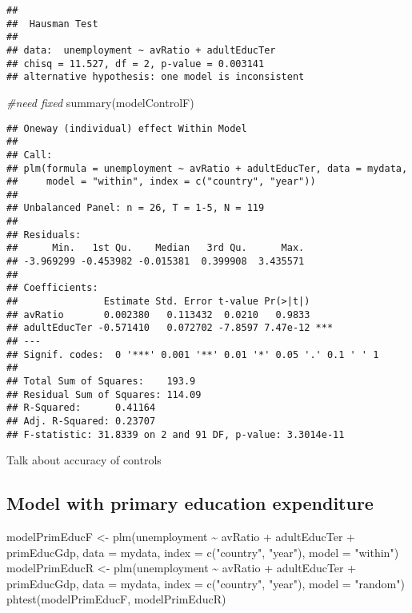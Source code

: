 \documentclass[
]{article}
\newenvironment{Shaded}{\begin{snugshade}}{\end{snugshade}}
\newcommand{\AttributeTok}[1]{\textcolor[rgb]{0.77,0.63,0.00}{#1}}
\newcommand{\CommentTok}[1]{\textcolor[rgb]{0.56,0.35,0.01}{\textit{#1}}}
\newcommand{\FunctionTok}[1]{\textcolor[rgb]{0.00,0.00,0.00}{#1}}
\newcommand{\NormalTok}[1]{#1}
\newcommand{\OtherTok}[1]{\textcolor[rgb]{0.56,0.35,0.01}{#1}}
\newcommand{\SpecialCharTok}[1]{\textcolor[rgb]{0.00,0.00,0.00}{#1}}
\newcommand{\StringTok}[1]{\textcolor[rgb]{0.31,0.60,0.02}{#1}}
\begin{document}
\begin{verbatim}
## 
##  Hausman Test
## 
## data:  unemployment ~ avRatio + adultEducTer
## chisq = 11.527, df = 2, p-value = 0.003141
## alternative hypothesis: one model is inconsistent
\end{verbatim}

\begin{Shaded}
\begin{Highlighting}[]
\CommentTok{\#need fixed}
\FunctionTok{summary}\NormalTok{(modelControlF)}
\end{Highlighting}
\end{Shaded}

\begin{verbatim}
## Oneway (individual) effect Within Model
## 
## Call:
## plm(formula = unemployment ~ avRatio + adultEducTer, data = mydata, 
##     model = "within", index = c("country", "year"))
## 
## Unbalanced Panel: n = 26, T = 1-5, N = 119
## 
## Residuals:
##      Min.   1st Qu.    Median   3rd Qu.      Max. 
## -3.969299 -0.453982 -0.015381  0.399908  3.435571 
## 
## Coefficients:
##               Estimate Std. Error t-value Pr(>|t|)    
## avRatio       0.002380   0.113432  0.0210   0.9833    
## adultEducTer -0.571410   0.072702 -7.8597 7.47e-12 ***
## ---
## Signif. codes:  0 '***' 0.001 '**' 0.01 '*' 0.05 '.' 0.1 ' ' 1
## 
## Total Sum of Squares:    193.9
## Residual Sum of Squares: 114.09
## R-Squared:      0.41164
## Adj. R-Squared: 0.23707
## F-statistic: 31.8339 on 2 and 91 DF, p-value: 3.3014e-11
\end{verbatim}

Talk about accuracy of controls

\hypertarget{model-with-primary-education-expenditure}{%
\subsection{Model with primary education
expenditure}\label{model-with-primary-education-expenditure}}

\begin{Shaded}
\begin{Highlighting}[]
\NormalTok{modelPrimEducF }\OtherTok{\textless{}{-}} \FunctionTok{plm}\NormalTok{(unemployment }\SpecialCharTok{\textasciitilde{}}\NormalTok{  avRatio }\SpecialCharTok{+}\NormalTok{ adultEducTer }\SpecialCharTok{+}\NormalTok{ primEducGdp,}
             \AttributeTok{data =}\NormalTok{ mydata, }\AttributeTok{index =} \FunctionTok{c}\NormalTok{(}\StringTok{"country"}\NormalTok{, }\StringTok{"year"}\NormalTok{), }\AttributeTok{model =} \StringTok{"within"}\NormalTok{)}
\NormalTok{modelPrimEducR }\OtherTok{\textless{}{-}} \FunctionTok{plm}\NormalTok{(unemployment }\SpecialCharTok{\textasciitilde{}}\NormalTok{  avRatio }\SpecialCharTok{+}\NormalTok{ adultEducTer }\SpecialCharTok{+}\NormalTok{ primEducGdp,}
             \AttributeTok{data =}\NormalTok{ mydata, }\AttributeTok{index =} \FunctionTok{c}\NormalTok{(}\StringTok{"country"}\NormalTok{, }\StringTok{"year"}\NormalTok{), }\AttributeTok{model =} \StringTok{"random"}\NormalTok{)}
\FunctionTok{phtest}\NormalTok{(modelPrimEducF, modelPrimEducR)}
\end{Highlighting}
\end{Shaded}
\end{document}
